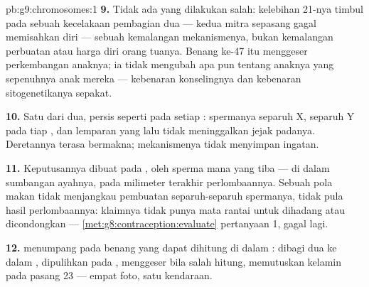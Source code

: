 \begin{solution}{pb:g9:chromosomes:1}
\textbf{9.} Tidak ada yang dilakukan salah: kelebihan 21-nya
timbul pada sebuah kecelakaan pembagian dua --- kedua mitra
sepasang gagal memisahkan diri --- sebuah kemalangan
mekanismenya, bukan kemalangan perbuatan atau harga diri
orang tuanya. Benang ke-47 itu menggeser perkembangan
anaknya; ia tidak mengubah apa pun tentang anaknya yang
sepenuhnya anak mereka --- kebenaran konselingnya dan
kebenaran sitogenetikanya sepakat.

\textbf{10.} Satu dari dua, persis seperti pada setiap
:  spermanya separuh X, separuh Y pada tiap
, dan lemparan yang lalu tidak meninggalkan
jejak padanya. Deretannya terasa bermakna; mekanismenya
tidak menyimpan ingatan.

\textbf{11.} Keputusannya dibuat pada , oleh
sperma mana yang tiba --- di dalam sumbangan ayahnya, pada
milimeter terakhir perlombaannya. Sebuah pola makan tidak
menjangkau pembuatan separuh-separuh  spermanya,
tidak pula hasil perlombaannya: klaimnya tidak punya mata
rantai untuk dihadang atau dicondongkan ---
\cref{met:g8:contraception:evaluate} pertanyaan 1, gagal lagi.

\textbf{12.}  menumpang pada benang yang
dapat dihitung di dalam : dibagi dua ke dalam
, dipulihkan pada , menggeser  bila
salah hitung, memutuskan kelamin pada pasang 23 --- empat
foto, satu kendaraan.
\end{solution}
